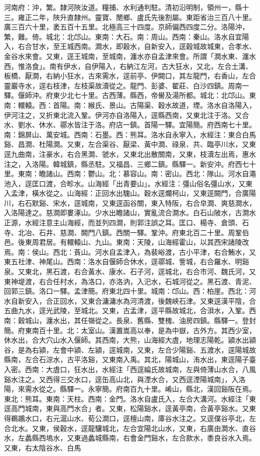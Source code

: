 \begin{pinyinscope}
河南府：沖，繁。隸河陜汝道。糧捕、水利通判駐。清初沿明制，領州一，縣十三。雍正二年，陜升直隸州。靈寶、閿鄉、盧氏先後割屬。東距省治三百八十里。廣三百六十里，袤五百十五里。北極高三十四度。京師偏西四度二分。洛陽沖，繁，難。倚。城北：北邙山。東南：大石。南：周山。西南：秦山。洛水自宜陽入，右合甘水，至王城西南。澗水，即穀水，自新安入，逕穀城故城東，合孝水、金谷水來會。又東，逕王城南，至城南，瀍水亦自孟津來會。所謂「澗水東、瀍水西，惟洛食」。南有伊水，自伊陽入，右納江左河，古大狂水，又北，左合土溝、板橋、厭澗，右納小狂水，古來需水，逕前亭、伊闕口，其左龍門，右香山，左合靈巖寺水，逕右枝津，左枝渠故瀆從之。龍門、彭婆、翟莊、白沙四鎮。周南一驛。偃師沖。府東少北七十里。古西薄。縣西，帝嚳及湯所都。城北：北邙山。東南：轘轅。西：首陽。南：緱氏、景山。古陽渠、穀水故道，堙。洛水自洛陽入，伊河注之，又折東北流入鞏。伊河亦自洛陽入，逕縣西南，又東北注于洛。又合水、劉水、休水、鄩水皆注于洛。府店一鎮。首陽一驛。宜陽簡。府西南七十里。南：錦屏山、萬安城。西南：石墨。西：熊耳。洛水自永寧入，水經注：東合白馬谿、昌澗、杜陽澗。又東，左合渠谷、厭梁、黃中澗、祿泉、共、臨亭川水，又東逕九曲南，注豪水，右合黑澗、虢水，又東北出散關南，又東，枝瀆左出焉，惠水注之，入洛陽。韓城鎮，縣丞駐。又福昌、三鄉二鎮。縣驛一。新安沖。府西七十里。東南：瞻諸山。西南：鬱山。北：慕容山。南：密山。西北：隊山。河水自澠池入，逕匡口渡，合畛水。山海經「出青要山」。水經注：彊山俗名彊山水，又東入孟津，橫水從之。山海經：正回水出騩山。穀水逕爛柯山，又東逕闕門，合廣陽川，右石默谿、宋水，逕城南，又東逕函谷關，東入特阪，右合皁澗、爽慈澗水，入洛陽達之。慈澗即婁涿山。少水出瞻諸山，實亂流合澗水。白石山陂水，古澗水正源，水經注意主山海經，而並列四澗，則郭注誤之耳。匡口、楊寺、倉頭、石寺、北冶、石井、慈澗、闕門八鎮。西關一驛。鞏沖。府東北百二十里。周鞏伯邑。後東周君居。有轘轅山、九山。東南：天陵，山海經霍山，以其西宋諸陵改焉。南：侯山。西北：萯山。河水自孟津入，為裴峪渡，古小平津，右合鮪水，又東五社津、神尾山。西南：洛水自偃師合休水，逕鄩城、訾城，右合羅水、明谿泉。又東北，黑石渡，右合黃水、康水、石子河，逕城北，右合市河、魏氏河，又東神堤渡，右合任村水，為洛口，亦洛汭，入汜水，石城河從之。黑石渡、青泥、回郭三鎮。洛口一驛。孟津簡。府東北四十里。城南：邙山。西：柏崖。西北：河水自新安入，合正回水，又東合滽滽水為河清渡，後魏峽石津。又東逕漢平陰，合五曲九水，逕光武陵，至城北。又東，古孟津，逕平縣故城北，合浿水，入鞏。西南：穀城山，瀍水出，其任嶺從之。長泉、舊縣、雙槐、油房四鎮。縣驛一。登封簡。府東南百十里。北：太室山。漢置嵩高以奉，是為中嶽，古外方。其西少室，休水出，合大穴山水入偃師。其西南，大熊，山海經大虘，地理志陽乾。潁水出潁谷，是為右潁，左會中潁、左潁，逕城南，又東，左合少陽谿、五渡水，逕陽城故縣南，左合石淙水，古平洛谿，又東南入禹。其北，陽城山，洧水出，東逕陽子臺入密。西南：大虘口，狂水出，水經注「西逕綸氏故城南，左與倚薄山水合，八風谿水注之。又西得三交水口，逕缶高山北，與湮水合，又西逕湮陽城南」，入洛陽，來需水從之。縣驛一。永寧簡。府南百九十里。崤山，縣北，漢回谿阪在焉。東北：熊耳。東南：天柱。西南：金門。洛水自盧氏入，左合大溝河。水經注「東逕高門城南，東與高門水合」者。又東，松陽谿水，逕黃亭南，合黃亭谿水。又東得鵜鶘水口，右元滬山水、荀公澗口，逕檀山南，庫谷水注之。又逕僕谷亭北，左合北水。又東，侯穀水，逕龍驤城北，左合宜陽北山水，又東，右廣由澗水、直谷水，左蠡縣西塢水，又東過蠡城縣南，右會金門谿水，左合款水，黍良谷水入焉。又東，右太陰谷水、白馬
\end{pinyinscope}
